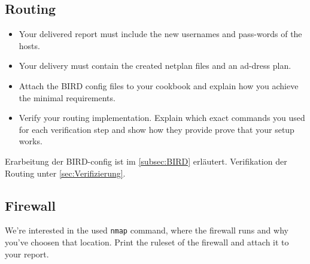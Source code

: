 \documentclass[11pt,titlepage]{article}
\newenvironment{shadedquotation}
 {\begin{shaded*}
  \quoting[leftmargin=0pt, vskip=0pt]
 }
 {\endquoting
 \end{shaded*}
}
\begin{document}
\subsection{Routing}
\label{subsec:Routing}
\begin{shadedquotation}
  \begin{itemize}
    \item Your delivered report must include the new usernames and pass-words of the hosts.
    \item Your delivery must contain the created netplan files and an ad-dress plan.
    \item Attach the BIRD config files to your cookbook and explain how you achieve the minimal requirements.
    \item Verify your routing implementation. Explain which exact commands you used for each verification step and show how they provide prove that your setup works.
  \end{itemize}
\end{shadedquotation}
Erarbeitung der BIRD-config ist im \ref{subsec:BIRD} erläutert.
Verifikation der Routing unter \ref{sec:Verifizierung}.

\subsection{Firewall}
\label{subsec:Firewall}

\begin{shadedquotation}
  We’re interested in the used \lstinline!nmap! command, where the firewall runs and why you’ve choosen that location. Print the ruleset of the firewall and attach it to your report.
\end{shadedquotation}
\end{document}
